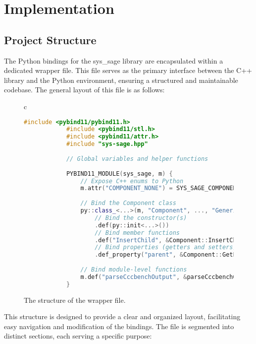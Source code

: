 \chapter{Implementation}\label{chapter:Implementation}

\section{Project Structure}

The Python bindings for the sys\_sage library are encapsulated within a dedicated wrapper file. This file serves as the primary interface between the C++ library and the Python environment, ensuring a structured and maintainable codebase. The general layout of this file is as follows:
\begin{figure}[htpb]
    \centering
    \begin{tabular}{c}
        \begin{lstlisting}[language=C++]
            #include <pybind11/pybind11.h>
            #include <pybind11/stl.h>
            #include <pybind11/attr.h>
            #include "sys-sage.hpp"
            
            // Global variables and helper functions
            
            PYBIND11_MODULE(sys_sage, m) {
                // Expose C++ enums to Python
                m.attr("COMPONENT_NONE") = SYS_SAGE_COMPONENT_NONE;
            
                // Bind the Component class
                py::class_<...>(m, "Component", ..., "Generic Component")
                    // Bind the constructor(s)
                    .def(py::init<...>())
                    // Bind member functions
                    .def("InsertChild", &Component::InsertChild, ...)
                    // Bind properties (getters and setters)
                    .def_property("parent", &Component::GetParent, &Component::SetParent, ...);
            
                // Bind module-level functions
                m.def("parseCccbenchOutput", &parseCccbenchOutput, ...);
            }
            \end{lstlisting}
    \end{tabular}
    \caption[Structure of the wrapper file]{The structure of the wrapper file.}\label{fig:wrapper-structure}
  \end{figure}


This structure is designed to provide a clear and organized layout, facilitating easy navigation and modification of the bindings. The file is segmented into distinct sections, each serving a specific purpose:

